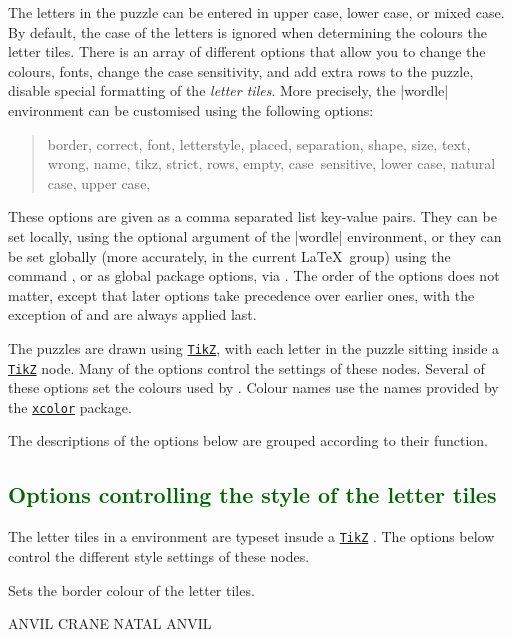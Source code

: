 \documentclass[svgnames]{report}
\newcommand\ctan[1]{\href{https://www.ctan.org/pkg/#1}{\texttt{#1}}}
\newcommand\Section[1]{\subsection{\textcolor{DarkGreen}{#1}}}
\begin{document}
  The letters in the puzzle can be entered in upper case, lower case, or
  mixed case. By default, the case of the letters is ignored when
  determining the colours the letter tiles.  There is an array of
  different options that allow you to  change the colours, fonts, change
  the case sensitivity, and add extra rows to the puzzle, disable
  special formatting of the \textit{letter tiles}. More precisely,
  the \keyword|wordle| environment can be customised using the
  following options:
  \begin{quote}\sffamily\color{Crimson}
    border,
    correct,
    font,
    letterstyle,
    placed,
    separation,
    shape,
    size,
    text,
    wrong,
    name,
    tikz,
    strict,
    rows,
    empty,
    case~sensitive,
    lower case,
    natural case,
    upper case,
  \end{quote}
  These options are given as a comma separated list key-value pairs.
  They can be set locally, using the optional argument of the
  \keyword|wordle| environment, or they can be set globally (more
  accurately, in the current \LaTeX\ group) using the
  \keyword{\WordleSetup} command , or
  as global package options, via \keyword{\usepackage[options]{wordle}}.
  The order of the options does not matter, except that later options
  take precedence over earlier ones, with the exception of 
  and  are always applied last.

  The  puzzles are drawn using \ctan{TikZ}, with each
  letter in the puzzle sitting inside a \ctan{TikZ} node. Many of the
  options control the settings of these nodes. Several of these options
  set the colours used by . Colour names use the
   names provided by the \ctan{xcolor} package.

  The descriptions of the options below are grouped according to their
  function.

  \Section{Options controlling the style of the letter tiles}

  The letter tiles in a  environment are typeset insude
  a \ctan{TikZ} \keyword{\node}. The options below control the different
  style settings of these nodes.


  Sets the border colour of the  letter tiles.

  \begin{example}
    \begin{wordle}[border=red]{ANVIL}
      CRANE
      NATAL
      ANVIL
    \end{wordle}
  \end{example}
\end{document}

